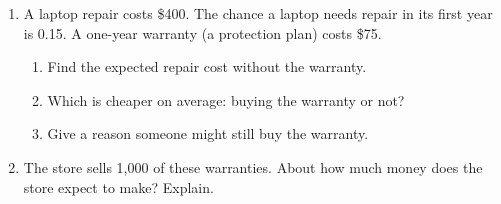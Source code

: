 \documentclass[11pt]{article}
\begin{document}
\begin{enumerate}
\begin{enumerate}[itemsep=1em]
\end{enumerate}
\work{3em}

\item A laptop repair costs \$400. The chance a laptop needs repair in its first year is 0.15. A one-year warranty (a protection plan) costs \$75.
\begin{enumerate}[itemsep=1em]
  \item Find the expected repair cost without the warranty. 
  \work{2em}
  \item Which is cheaper on average: buying the warranty or not? 
  \work{2em}
  \item Give a reason someone might still buy the warranty.

\end{enumerate}
\work{2em}

\item The store sells 1,000 of these warranties. About how much money does the store expect to make? Explain.


\end{enumerate}
\end{document}
